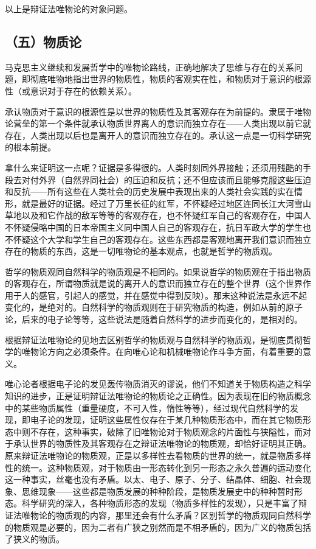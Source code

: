 以上是辩证法唯物论的对象问题。

\subsection{（五）物质论}

马克思主义继续和发展哲学中的唯物论路线，正确地解决了思维与存在的关系问题，即彻底唯物地指出世界的物质性，物质的客观实在性，和物质对于意识的根源性（或意识对于存在的依赖关系）。

承认物质对于意识的根源性是以世界的物质性及其客观存在为前提的。隶属于唯物论营垒的第一个条件就承认物质世界离人的意识而独立存在——人类出现以前它就存在，人类出现以后也是离开人的意识而独立存在的。承认这一点是一切科学研究的根本前提。

拿什么来证明这一点呢？证据是多得很的。人类时刻同外界接触；还须用残酷的手段去对付外界（自然界同社会）的压迫和反抗；还不但应该而且能够克服这些压迫和反抗——所有这些在人类社会的历史发展中表现出来的人类社会实践的实在情形，就是最好的证据。经过了万里长征的红军，不怀疑经过地区连同长江大河雪山草地以及和它作战的敌军等等的客观存在，也不怀疑红军自己的客观存在，中国人不怀疑侵略中国的日本帝国主义同中国人自己的客观存在，抗日军政大学的学生也不怀疑这个大学和学生自己的客观存在。这些东西都是客观地离开我们意识而独立存在的物质的东西，这是一切唯物论的基本观点，也就是哲学的物质观。

哲学的物质观同自然科学的物质观是不相同的。如果说哲学的物质观在于指出物质的客观存在，所谓物质就是说的离开人的意识而独立存在的整个世界（这个世界作用于人的感官，引起人的感觉，并在感觉中得到反映）。那末这种说法是永远不起变化的，是绝对的。自然科学的物质观则在于研究物质的构造，例如从前的原子论，后来的电子论等等，这些说法是随着自然科学的进步而变化的，是相对的。

根据辩证法唯物论的见地去区别哲学的物质观与自然科学的物质观，是彻底贯彻哲学的唯物论方向之必须条件。在向唯心论和机械唯物论作斗争方面，有着重要的意义。

唯心论者根据电子论的发见轰传物质消灭的谬说，他们不知道关于物质构造之科学知识的进步，正是证明辩证法唯物论的物质论之正确性。因为表现在旧的物质概念中的某些物质属性（重量硬度，不可入性，惰性等等），经过现代自然科学的发现，即电子论的发现，证明这些属性仅存在于某几种物质形态中，而在其它物质形态中则不存在，这种事实，破除了旧唯物论对于物质观念的片面性与狭隘性，而对于承认世界的物质性及其客观存在之辩证法唯物论的物质观，却恰好证明其正确。原来辩证法唯物论的物质观，正是以多样性去看物质的世界的统一，就是物质多样性的统一。这种物质观，对于物质由一形态转化到另一形态之永久普遍的运动变化这一种事实，丝毫也没有矛盾。以太、电子、原子、分子、结晶体、细胞、社会现象、思维现象——这些都是物质发展的种种阶段，是物质发展史中的种种暂时形态。科学研究的深入，各种物质形态的发现（物质多样性的发现），只是丰富了辩证法唯物论的物质观的内容，那里还会有什么矛盾？区别哲学的物质观同自然科学的物质观是必要的，因为二者有广狭之别然而是不相矛盾的，因为广义的物质包括了狭义的物质。

